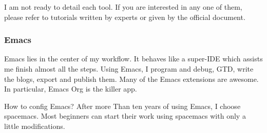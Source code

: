 \documentclass[koma,a4paper,utopia,10pt,listings-color,microtype,paralist,colorlinks]{org-article}
\begin{document}
I am not ready to detail each tool. If you are interested in any one of them,
please refer to tutorials written by experts or given by the official document.

\subsubsection{Emacs}
\label{sec:org76d34e1}


Emacs lies in the center of my workflow. It behaves like a super-IDE which
assists me finish almost all the steps. Using Emacs, I program and debug, GTD,
write the blogs, export and publish them. Many of the Emacs extensions are
awesome. In particular, Emacs Org is the killer app.

How to config Emacs? After more Than ten years of using Emacs, I choose
spacemacs. Most beginners can start their work using spacemacs with only a
little modifications.
\end{document}
